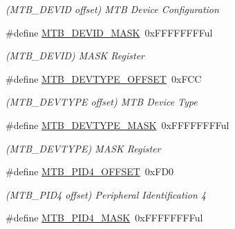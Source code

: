\begin{DoxyCompactItemize}
\begin{DoxyCompactList}\small\item\em (M\+T\+B\+\_\+\+D\+E\+V\+I\+D offset) M\+T\+B Device Configuration \end{DoxyCompactList}\item 
\hypertarget{group___s_a_m_l21___m_t_b_ga147985e87253b34031d2211adc4dc56f}{}\#define \hyperlink{group___s_a_m_l21___m_t_b_ga147985e87253b34031d2211adc4dc56f}{M\+T\+B\+\_\+\+D\+E\+V\+I\+D\+\_\+\+M\+A\+S\+K}~0x\+F\+F\+F\+F\+F\+F\+F\+Ful\label{group___s_a_m_l21___m_t_b_ga147985e87253b34031d2211adc4dc56f}

\begin{DoxyCompactList}\small\item\em (M\+T\+B\+\_\+\+D\+E\+V\+I\+D) M\+A\+S\+K Register \end{DoxyCompactList}\item 
\hypertarget{group___s_a_m_l21___m_t_b_ga87deaa0bed137100030f719bd78e41da}{}\#define \hyperlink{group___s_a_m_l21___m_t_b_ga87deaa0bed137100030f719bd78e41da}{M\+T\+B\+\_\+\+D\+E\+V\+T\+Y\+P\+E\+\_\+\+O\+F\+F\+S\+E\+T}~0x\+F\+C\+C\label{group___s_a_m_l21___m_t_b_ga87deaa0bed137100030f719bd78e41da}

\begin{DoxyCompactList}\small\item\em (M\+T\+B\+\_\+\+D\+E\+V\+T\+Y\+P\+E offset) M\+T\+B Device Type \end{DoxyCompactList}\item 
\hypertarget{group___s_a_m_l21___m_t_b_ga244b3a615fef938ce78209f57b7c93e1}{}\#define \hyperlink{group___s_a_m_l21___m_t_b_ga244b3a615fef938ce78209f57b7c93e1}{M\+T\+B\+\_\+\+D\+E\+V\+T\+Y\+P\+E\+\_\+\+M\+A\+S\+K}~0x\+F\+F\+F\+F\+F\+F\+F\+Ful\label{group___s_a_m_l21___m_t_b_ga244b3a615fef938ce78209f57b7c93e1}

\begin{DoxyCompactList}\small\item\em (M\+T\+B\+\_\+\+D\+E\+V\+T\+Y\+P\+E) M\+A\+S\+K Register \end{DoxyCompactList}\item 
\hypertarget{group___s_a_m_l21___m_t_b_gabbad22967e64b48b6925a9dcff4a9ea8}{}\#define \hyperlink{group___s_a_m_l21___m_t_b_gabbad22967e64b48b6925a9dcff4a9ea8}{M\+T\+B\+\_\+\+P\+I\+D4\+\_\+\+O\+F\+F\+S\+E\+T}~0x\+F\+D0\label{group___s_a_m_l21___m_t_b_gabbad22967e64b48b6925a9dcff4a9ea8}

\begin{DoxyCompactList}\small\item\em (M\+T\+B\+\_\+\+P\+I\+D4 offset) Peripheral Identification 4 \end{DoxyCompactList}\item 
\hypertarget{group___s_a_m_l21___m_t_b_gaa392cc96fa9dc29bba3512293a81f1dd}{}\#define \hyperlink{group___s_a_m_l21___m_t_b_gaa392cc96fa9dc29bba3512293a81f1dd}{M\+T\+B\+\_\+\+P\+I\+D4\+\_\+\+M\+A\+S\+K}~0x\+F\+F\+F\+F\+F\+F\+F\+Ful\label{group___s_a_m_l21___m_t_b_gaa392cc96fa9dc29bba3512293a81f1dd}


\end{DoxyCompactItemize}

